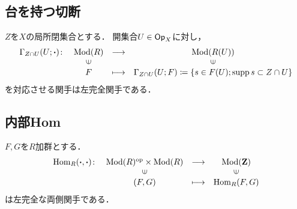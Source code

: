 \subsection{台を持つ切断}

\begin{PRP}[台を持つ切断は左完全]
    \(Z\)を\(X\)の局所閉集合とする．
    開集合$U\in\mathop{\textsf{Op}}\nolimits_{X}$に対し，
    \[
        \begin{array}{rccc}
            \Gamma_{Z\cap U}(U;{\boldsymbol{\cdot}})\colon&\Mod(R)&\longrightarrow&\Mod(R(U))\\
            &\rotatebox{90}{$\in$}&&\rotatebox{90}{$\in$}\\
            &F&\longmapsto&\Gamma_{Z\cap U}(U;F)\coloneqq\left\{s\in F(U); \supp{s}\subset Z\cap U\right\}
        \end{array}
    \]
    を対応させる関手は左完全関手である．
\end{PRP}



























\subsection{内部Hom}
\begin{PRP}[Homは左完全]
    $F,G$を$R$加群とする．
    \begin{equation*}
        \begin{array}{rccc}
            \Hom_R({\boldsymbol{\cdot}},{\boldsymbol{\cdot}})\colon
            &\Mod(R)^{\op}\times\Mod(R)
            &\longrightarrow&\Mod(\zz)\\
            &\rotatebox{90}{$\in$}&&\rotatebox{90}{$\in$}\\
            & (F,G)&\longmapsto&\Hom_R(F,G)
        \end{array}
    \end{equation*}
    は左完全な両側関手である．
\end{PRP}



